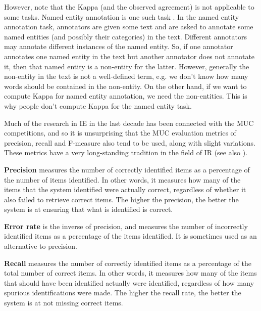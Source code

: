 However, note that the Kappa (and the observed agreement) is not applicable to some
tasks. Named entity annotation is  one such task
\cite{Hripcsak05}. In the named entity annotation task, annotators are given 
some text and are asked to annotate some named entities (and possibly their 
categories) in the text. Different annotators may annotate different instances
of the named entity. So, if one annotator annotates one named entity in the text but
another annotator does not annotate it, then that named entity is a non-entity
for the latter. However, generally the non-entity in the text is not a well-defined 
term, e.g. we don't know how many words should be contained in the non-entity. On the 
other hand, if we want to compute Kappa for named entity annotation, we need
the non-entities. This is why people don't compute Kappa for the named entity task.


Much of the research in IE in the last decade has been connected with
the MUC competitions, and so it is unsurprising that the MUC
evaluation metrics of precision, recall and F-measure
\cite{Chinchor92} also tend to be used, along with slight
variations. These metrics have a very long-standing tradition in the
field of IR \cite{van79} (see also \cite{Man99,Fra92}).

\textbf{Precision} measures the number of correctly identified items
as a percentage of the number of items identified. In other words, it
measures how many of the items that the system identified were
actually correct, regardless of whether it also failed to retrieve
correct items. The higher the precision, the better the system is
at ensuring that what is identified is correct. 

\textbf{Error rate} is the inverse of precision, and measures the
number of incorrectly identified items as a percentage of the items
identified. It is sometimes used as an alternative to precision.

\textbf{Recall} measures the number of correctly identified items as a
percentage of the total number of correct items. In other words, it
measures how many of the items that should have been identified
actually were identified, regardless of how many spurious
identifications were made. The higher the recall rate, the better the
system is at not missing correct items.

